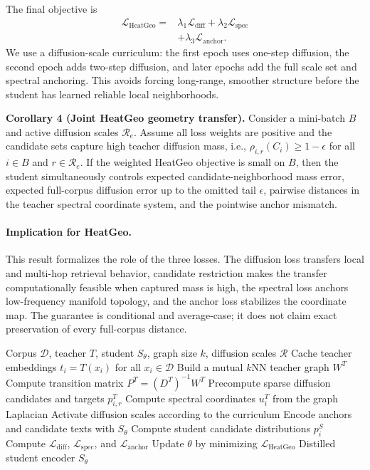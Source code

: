 The final objective is
\begin{equation}
\begin{aligned}
    \mathcal{L}_{\mathrm{HeatGeo}}
    ={}&
    \lambda_{1}\mathcal{L}_{\mathrm{diff}}
    +
    \lambda_{2}\mathcal{L}_{\mathrm{spec}}
    \\
    &+
    \lambda_{3}\mathcal{L}_{\mathrm{anchor}}.
\end{aligned}
\end{equation}
We use a diffusion-scale curriculum: the first epoch uses one-step diffusion, the second epoch adds two-step diffusion, and later epochs add the full scale set and spectral anchoring. This avoids forcing long-range, smoother structure before the student has learned reliable local neighborhoods.

\smallskip
\noindent\textbf{Corollary 4 (Joint HeatGeo geometry transfer).}
Consider a mini-batch $B$ and active diffusion scales $\mathcal{R}_e$. Assume all loss weights are positive and the candidate sets capture high teacher diffusion mass, i.e., $\rho_{i,r}(C_i)\ge 1-\epsilon$ for all $i\in B$ and $r\in\mathcal{R}_e$. If the weighted HeatGeo objective is small on $B$, then the student simultaneously controls expected candidate-neighborhood mass error, expected full-corpus diffusion error up to the omitted tail $\epsilon$, pairwise distances in the teacher spectral coordinate system, and the pointwise anchor mismatch.

\paragraph{Implication for HeatGeo.}
This result formalizes the role of the three losses. The diffusion loss transfers local and multi-hop retrieval behavior, candidate restriction makes the transfer computationally feasible when captured mass is high, the spectral loss anchors low-frequency manifold topology, and the anchor loss stabilizes the coordinate map. The guarantee is conditional and average-case; it does not claim exact preservation of every full-corpus distance.

\begin{algorithm}[t]
\caption{HeatGeo Training}
\label{alg:heatgeo}
\begin{algorithmic}[1]
\REQUIRE Corpus $\mathcal{D}$, teacher $T$, student $S_{\theta}$, graph size $k$, diffusion scales $\mathcal{R}$
\STATE Cache teacher embeddings $t_i=T(x_i)$ for all $x_i\in\mathcal{D}$
\STATE Build a mutual $k$NN teacher graph $W^T$
\STATE Compute transition matrix $P^T=(D^T)^{-1}W^T$
\STATE Precompute sparse diffusion candidates and targets $p_{i,r}^T$
\STATE Compute spectral coordinates $u_i^T$ from the graph Laplacian
    \STATE Activate diffusion scales according to the curriculum
        \STATE Encode anchors and candidate texts with $S_{\theta}$
        \STATE Compute student candidate distributions $p_i^S$
        \STATE Compute $\mathcal{L}_{\mathrm{diff}}$, $\mathcal{L}_{\mathrm{spec}}$, and $\mathcal{L}_{\mathrm{anchor}}$
        \STATE Update $\theta$ by minimizing $\mathcal{L}_{\mathrm{HeatGeo}}$
    \ENDFOR
\ENDFOR
\RETURN Distilled student encoder $S_{\theta}$
\end{algorithmic}
\end{algorithm}
